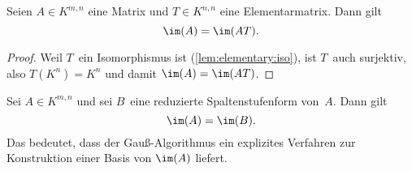 \documentclass[a4paper]{article}
\begin{document}
\begin{lemma}
    Seien $A \in K^{m,n}$ eine Matrix und $T \in K^{n,n}$ eine Elementarmatrix. Dann gilt
    \begin{equation*}
        \im(A) = \im(AT).
    \end{equation*}
\end{lemma}

\begin{proof}
    Weil $T$~ein Isomorphismus ist (\cref{lem:elementary:iso}), ist $T$~auch surjektiv, also $T(K^n) = K^n$ und damit $\im(A) = \im(AT)$.
\end{proof}

\begin{corollary}
    Sei $A \in K^{m,n}$ und sei $B$~eine reduzierte Spaltenstufenform von~$A$. Dann gilt
    \begin{equation*}
        \im(A) = \im(B).
    \end{equation*}
    Das bedeutet, dass der Gauß-Algorithmus ein explizites Verfahren zur Konstruktion einer Basis von $\im(A)$ liefert.
\end{corollary}

\end{document}
